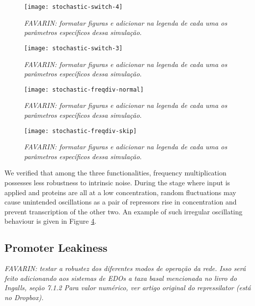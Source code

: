     \begin{figure}[!htbp]
      \centering
      \texttt{[image: stochastic-switch-4]}
      \caption{\textit{FAVARIN: formatar figuras e adicionar na legenda de cada uma os parâmetros específicos dessa simulação.}}
      \label{fig.stochastic-switch-4}
    \end{figure}

    \begin{figure}[!htbp]
      \centering
      \texttt{[image: stochastic-switch-3]}
      \caption{\textit{FAVARIN: formatar figuras e adicionar na legenda de cada uma os parâmetros específicos dessa simulação.}}
      \label{fig.stochastic-switch-3}
    \end{figure}

    \begin{figure}[!htbp]
      \centering
      \texttt{[image: stochastic-freqdiv-normal]}
      \caption{\textit{FAVARIN: formatar figuras e adicionar na legenda de cada uma os parâmetros específicos dessa simulação.}}
      \label{fig.stochastic-freqdiv-normal}
    \end{figure}

    \begin{figure}[!htbp]
      \centering
      \texttt{[image: stochastic-freqdiv-skip]}
      \caption{\textit{FAVARIN: formatar figuras e adicionar na legenda de cada uma os parâmetros específicos dessa simulação.}}
      \label{fig.stochastic-freqdiv-skip}
    \end{figure}

    We verified that among the three functionalities, frequency multiplication possesses less robustness to intrinsic noise.
    During the stage where input is applied and proteins are all at a low concentration, random fluctuations may cause unintended oscillations as a pair of repressors rise in concentration and prevent transcription of the other two.
    An example of such irregular oscillating behaviour is given in Figure \ref{fig.stochastic-freqdiv-skip}.


  \subsection{Promoter Leakiness}

    \textit{FAVARIN: testar a robustez dos diferentes modos de operação da rede.
    Isso será feito adicionando aos sistemas de EDOs a taxa basal mencionada no livro do Ingalls, seção 7.1.2
    Para valor numérico, ver artigo original do repressilator (está no Dropbox).}


